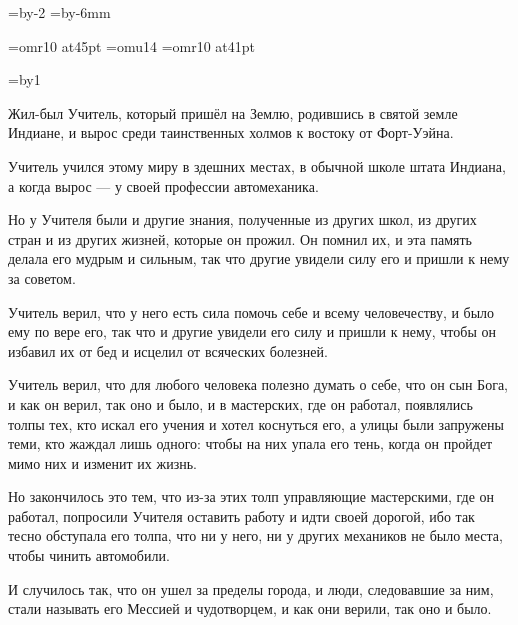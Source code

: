 
\shthickness=0pt

\pdfpagewidth=297mm
\pdfpageheight=210mm
\pdfhorigin=-300pt
\pdfvorigin=1in
\shvoffset=-1in

\htotal=423pt
\vtotal=595pt
\horigin=3.5mm
\vorigin=2.5mm
\hsize=\htotal \advance\hsize by-2\horigin
\vsize=\vtotal \advance\vsize by-6mm

\font\chapfont=omr10 at45pt
\font\handfont=omu14
\font\bukvfont=omr10 at41pt

\nopagenumbers

\raggedbottom

{}
\vskip3cm

\begingroup
\baselineskip=17pt
\newcount\n
\everypar={\advance\n by1 \hang}
\parskip=30pt
\raggedright
\handfont

Жил-был Учитель, который пришёл на Землю, родившись в святой земле Индиане, и вырос среди таинственных холмов к востоку от Форт-Уэйна.

Учитель учился этому миру в здешних местах, в обычной школе штата Индиана, а когда вырос --- у своей профессии автомеханика.

Но у Учителя были и другие знания, полученные из других школ, из других стран и из других жизней, которые он прожил. Он помнил их, и эта память делала его мудрым и сильным, так что другие увидели силу его и пришли к нему за советом.

Учитель верил, что у него есть сила помочь себе и всему человечеству, и было ему по вере его, так что и другие увидели его силу и пришли к нему, чтобы он избавил их от бед и исцелил от всяческих болезней.

Учитель верил, что для любого человека полезно думать о себе, что он сын Бога, и как он верил, так оно и было, и в мастерских, где он работал, появлялись толпы тех, кто искал его учения и хотел коснуться его, а улицы были запружены теми, кто жаждал лишь одного: чтобы на них упала его тень, когда он пройдет мимо них и изменит их жизнь.

Но закончилось это тем, что из-за этих толп управляющие мастерскими, где он работал, попросили Учителя оставить работу и идти своей дорогой, ибо так тесно обступала его толпа, что ни у него, ни у других механиков не было места, чтобы чинить автомобили.

И случилось так, что он ушел за пределы города, и люди, следовавшие за ним, стали называть его Мессией и чудотворцем, и как они верили, так оно и было.

